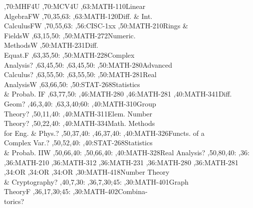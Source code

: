 \documentclass{article}
\begin{document}
\thispagestyle{empty}
\begin{chart}
\grid
{},70:{MHF4U}
,70:{MCV4U}
,63:{MATH-110}{Linear\\Algebra}{FW}
  ,70,35,63:
,63:{MATH-120}{Diff. \& Int.\\Calculus}{FW}
  ,70,55,63:
,56:{CISC-1xx}
,50:{MATH-210}{Rings \&\\Fields}{W}
  ,63,15,50:
,50:{MATH-272}{Numeric.\\Methods}{W}
,50:{MATH-231}{Diff.\\Equat.}{F}
  ,63,35,50:
,50:{MATH-228}{Complex\\Analysis}{?}
  ,63,45,50:
  ,63,45,50:
,50:{MATH-280}{Advanced\\Calculus}{?}
  ,63,55,50:
  ,63,55,50:
,50:{MATH-281}{Real\\Analysis}{W}
  ,63,66,50:
,50:{STAT-268}{Statistics\\\& Probab. I}{F}
  ,63,77,50:
,46:{MATH-280}
,46:{MATH-281}
,40:{MATH-341}{Diff.\\Geom}{?}
  ,46,3,40:
  ,63,3,40;60:
,40:{MATH-310}{Group\\Theory}{?}
  ,50,11,40:
,40:{MATH-311}{Elem. Number\\Theory}{?}
  ,50,22,40:
,40:{MATH-334}{Math. Methods\\for Eng. \& Phys.}{?}
  ,50,37,40:
  ,46,37,40:
,40:{MATH-326}{Functs. of a\\Complex Var.}{?}
  ,50,52,40:
,40:{STAT-268}{Statistics\\\& Probab. II}{W}
  ,50,66,40:
  ,50,66,40:
,40:{MATH-328}{Real Analysis}{?}
  ,50,80,40:
,36:{}
,36:{MATH-210}
,36:{MATH-312}
,36:{MATH-231}
,36:{MATH-280}
,36:{MATH-281}
,34:{OR}
,34:{OR}
,34:{OR}
,30:{MATH-418}{Number Theory\\\& Cryptography}{?}
  ,40,7,30:
  ,36,7,30;45:
,30:{MATH-401}{Graph\\Theory}{F}
  ,36,17,30;45:
,30:{MATH-402}{Combina-\\torics}{?}

\end{chart}
\end{document}
